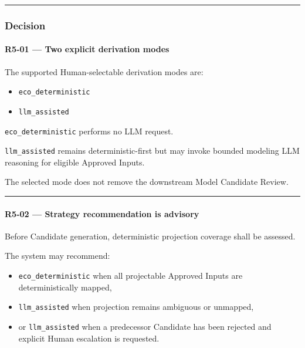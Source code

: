 \begin{center}\rule{0.5\linewidth}{0.5pt}\end{center}

\hypertarget{decision-13}{%
\subsubsection{Decision}\label{decision-13}}

\hypertarget{r5-01--two-explicit-derivation-modes}{%
\paragraph{R5-01 --- Two explicit derivation modes}\label{r5-01--two-explicit-derivation-modes}}

The supported Human-selectable derivation modes are:

\begin{itemize}
\tightlist
\item
  \texttt{eco\_deterministic}
\item
  \texttt{llm\_assisted}
\end{itemize}

\texttt{eco\_deterministic} performs no LLM request.

\texttt{llm\_assisted} remains deterministic-first but may invoke bounded modeling LLM reasoning for eligible Approved Inputs.

The selected mode does not remove the downstream Model Candidate Review.

\begin{center}\rule{0.5\linewidth}{0.5pt}\end{center}

\hypertarget{r5-02--strategy-recommendation-is-advisory}{%
\paragraph{R5-02 --- Strategy recommendation is advisory}\label{r5-02--strategy-recommendation-is-advisory}}

Before Candidate generation, deterministic projection coverage shall be assessed.

The system may recommend:

\begin{itemize}
\tightlist
\item
  \texttt{eco\_deterministic} when all projectable Approved Inputs are deterministically mapped,
\item
  \texttt{llm\_assisted} when projection remains ambiguous or unmapped,
\item
  or \texttt{llm\_assisted} when a predecessor Candidate has been rejected and explicit Human escalation is requested.
\end{itemize}

